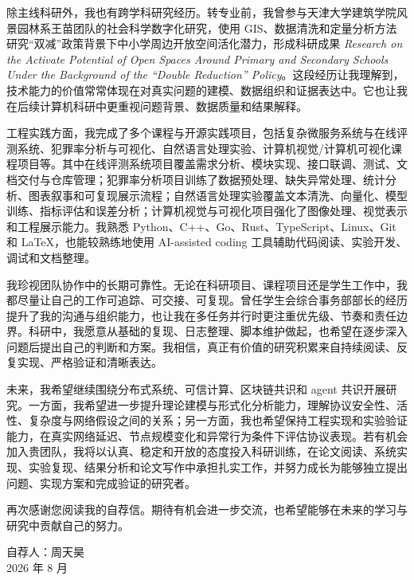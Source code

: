 \documentclass[11pt,a4paper]{article}
\begin{document}
除主线科研外，我也有跨学科研究经历。转专业前，我曾参与天津大学建筑学院风景园林系王苗团队的社会科学数字化研究，使用 GIS、数据清洗和定量分析方法研究“双减”政策背景下中小学周边开放空间活化潜力，形成科研成果 \textit{Research on the Activate Potential of Open Spaces Around Primary and Secondary Schools Under the Background of the ``Double Reduction'' Policy}。这段经历让我理解到，技术能力的价值常常体现在对真实问题的建模、数据组织和证据表达中。它也让我在后续计算机科研中更重视问题背景、数据质量和结果解释。

工程实践方面，我完成了多个课程与开源实践项目，包括复杂微服务系统与在线评测系统、犯罪率分析与可视化、自然语言处理实验、计算机视觉/计算机可视化课程项目等。其中在线评测系统项目覆盖需求分析、模块实现、接口联调、测试、文档交付与仓库管理；犯罪率分析项目训练了数据预处理、缺失异常处理、统计分析、图表叙事和可复现展示流程；自然语言处理实验覆盖文本清洗、向量化、模型训练、指标评估和误差分析；计算机视觉与可视化项目强化了图像处理、视觉表示和工程展示能力。我熟悉 Python、C++、Go、Rust、TypeScript、Linux、Git 和 LaTeX，也能较熟练地使用 AI-assisted coding 工具辅助代码阅读、实验开发、调试和文档整理。

我珍视团队协作中的长期可靠性。无论在科研项目、课程项目还是学生工作中，我都尽量让自己的工作可追踪、可交接、可复现。曾任学生会综合事务部部长的经历提升了我的沟通与组织能力，也让我在多任务并行时更注重优先级、节奏和责任边界。科研中，我愿意从基础的复现、日志整理、脚本维护做起，也希望在逐步深入问题后提出自己的判断和方案。我相信，真正有价值的研究积累来自持续阅读、反复实现、严格验证和清晰表达。

未来，我希望继续围绕分布式系统、可信计算、区块链共识和 agent 共识开展研究。一方面，我希望进一步提升理论建模与形式化分析能力，理解协议安全性、活性、复杂度与网络假设之间的关系；另一方面，我也希望保持工程实现和实验验证能力，在真实网络延迟、节点规模变化和异常行为条件下评估协议表现。若有机会加入贵团队，我将以认真、稳定和开放的态度投入科研训练，在论文阅读、系统实现、实验复现、结果分析和论文写作中承担扎实工作，并努力成长为能够独立提出问题、实现方案和完成验证的研究者。

再次感谢您阅读我的自荐信。期待有机会进一步交流，也希望能够在未来的学习与研究中贡献自己的努力。

\vspace{1em}
\begin{flushright}
  自荐人：周天昊\\
  2026 年 8 月
\end{flushright}
\end{document}
